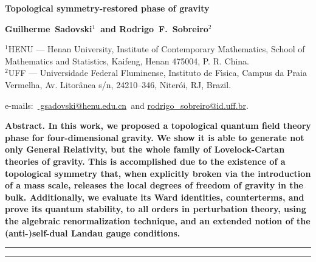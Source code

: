 \documentclass[main.tex]{subfiles}
\begin{document}
\thispagestyle{empty}
{
\noindent
\Large
\bfseries
Topological symmetry-restored phase of gravity
\bigskip
\bigskip
}

{
\noindent
\bfseries
Guilherme~Sadovski${}^{1}${\normalfont~and}
Rodrigo~F.~Sobreiro${}^{2}$
\bigskip
}

{
\noindent
\footnotesize
${}^{1}$HENU --- Henan University, Institute of Contemporary Mathematics, School of Mathematics and Statistics, Kaifeng, Henan 475004, P. R. China. \\
${}^{2}$UFF --- Universidade Federal Fluminense, Instituto de F{\'{\i}}sica, Campus da Praia Vermelha, Av. Litor{\^{a}}nea s/n, 24210--346, Niter{\'{o}}i, RJ, Brazil.
\bigskip
\bigskip
}

{
\noindent
\footnotesize
\rmfamily
e-mails:~\href{
  mailto:gsadovski@henu.edu.cn}{
  gsadovski@henu.edu.cn}{\normalfont~and}
\href{
  mailto:rodrigo\_sobreiro@id.uff.br
}{
  rodrigo\_sobreiro@id.uff.br}{\normalfont.}
\bigskip
}

{
\noindent
\bfseries
Abstract.
\normalfont{}
In this work, we proposed a topological quantum field theory phase for four-dimensional gravity. We show it is able to generate not only General Relativity, but the whole family of Lovelock-Cartan theories of gravity. This is accomplished due to the existence of a topological symmetry that, when explicitly broken via the introduction of a mass scale, releases the local degrees of freedom of gravity in the bulk. Additionally, we evaluate its Ward identities, counterterms, and prove its quantum stability, to all orders in perturbation theory, using the algebraic renormalization technique, and an extended notion of the (anti-){}self-dual Landau gauge conditions.
\bigskip
}

{
\noindent
\rule{\textwidth}{1pt}
\tableofcontents
\smallskip
\noindent
\rule{\linewidth}{1pt}
}
\end{document}
